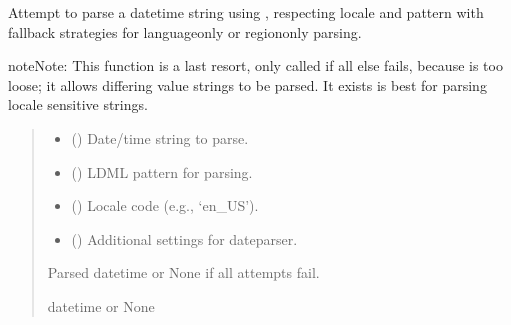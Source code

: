 \documentclass[letterpaper,10pt,english]{sphinxmanual}
\begin{document}
\begin{fulllineitems}
\label{\detokenize{apache_commons_validator_python.util:apache_commons_validator_python.util.datetime_helpers.fuzzy_parse}}
\pysigstartsignatures
{}
\pysigstopsignatures
\sphinxAtStartPar
Attempt to parse a datetime string using , respecting locale and pattern
with fallback strategies for language\sphinxhyphen{}only or region\sphinxhyphen{}only parsing.

\begin{sphinxadmonition}{note}{Note:}
\sphinxAtStartPar
This function is a last resort, only called if all else fails, because
 is too loose; it allows differing value strings to be parsed.
It exists  is best for parsing locale sensitive strings.
\end{sphinxadmonition}
\begin{quote}\begin{description}
\begin{itemize}
\item {} 
\sphinxAtStartPar
{} () \textendash{} Date/time string to parse.

\item {} 
\sphinxAtStartPar
{} () \textendash{} LDML pattern for parsing.

\item {} 
\sphinxAtStartPar
{} () \textendash{} Locale code (e.g., ‘en\_US’).

\item {} 
\sphinxAtStartPar
{} () \textendash{} Additional settings for dateparser.

\end{itemize}

\sphinxAtStartPar
Parsed datetime or None if all attempts fail.

\sphinxAtStartPar
datetime or None

\end{description}\end{quote}

\end{fulllineitems}
\end{document}
